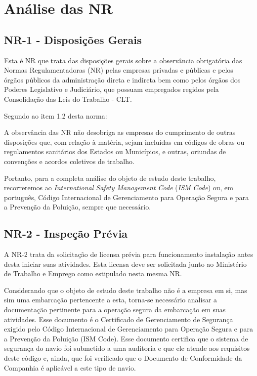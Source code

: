\chapter{Análise das NR}
\section{NR-1 - Disposições Gerais}
Esta é NR que trata das disposições gerais sobre a observância obrigatória das Normas Regulamentadoras (NR) pelas empresas privadas e públicas e pelos órgãos públicos da administração direta e indireta bem como pelos órgãos dos Poderes Legislativo e Judiciário, que possuam empregados regidos pela Consolidação das Leis do Trabalho - CLT.

Segundo ao item 1.2 desta norma:

\begin{citacao}
A observância das NR não desobriga as empresas do cumprimento de outras disposições que, com relação à matéria, sejam incluídas em códigos de obras ou regulamentos sanitários dos Estados ou Municípios, e outras, oriundas de convenções e acordos coletivos de trabalho.
\end{citacao}

Portanto, para a completa análise do objeto de estudo deste trabalho, recorreremos ao \emph{International Safety Management Code} (\emph{ISM Code}) ou, em português, Código Internacional de Gerenciamento para Operação Segura e para a Prevenção da Poluição, sempre que necessário.

\section{NR-2 - Inspeção Prévia}
A NR-2 trata da solicitação de licensa prévia para funcionamento instalação antes desta iniciar suas atividades. Esta licensa deve ser solicitada junto ao Ministério de Trabalho e Emprego como estipulado nesta mesma NR.

Considerando que o objeto de estudo deste trabalho não é a empresa em si, mas sim uma embarcação pertencente a esta, torna-se necessário analisar a documentação pertinente para a operação segura da embarcação em suas atividades. Esse documento é o Certificado de Gerenciamento de Segurança exigido pelo Código Internacional de Gerenciamento para Operação Segura e para a Prevenção da Poluição (ISM Code). Esse documento certifica que o sistema de segurança do navio foi submetido a uma auditoria e que ele atende aos requisitos deste código e, ainda, que foi verificado que o Documento de Conformidade da Companhia é aplicável a este tipo de navio.


